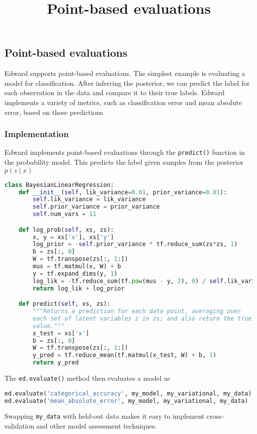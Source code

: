 \title{Point-based evaluations}

\subsection{Point-based evaluations}

Edward supports point-based evaluations. The simplest example is
evaluating a model for classification. After inferring the posterior,
we can predict the label for each observation in the data and compare
it to their true labels. Edward implements a variety of metrics, such
as classification error and mean absolute error, based on these
predictions.

\subsubsection{Implementation}

Edward implements point-based evaluations through the
\texttt{predict()} function in the probability model. This
predicts the label given samples from the posterior $p(z \mid x)$
\begin{lstlisting}[language=Python]
class BayesianLinearRegression:
    def __init__(self, lik_variance=0.01, prior_variance=0.01):
        self.lik_variance = lik_variance
        self.prior_variance = prior_variance
        self.num_vars = 11

    def log_prob(self, xs, zs):
        x, y = xs['x'], xs['y']
        log_prior = -self.prior_variance * tf.reduce_sum(zs*zs, 1)
        b = zs[:, 0]
        W = tf.transpose(zs[:, 1:])
        mus = tf.matmul(x, W) + b
        y = tf.expand_dims(y, 1)
        log_lik = -tf.reduce_sum(tf.pow(mus - y, 2), 0) / self.lik_variance
        return log_lik + log_prior

    def predict(self, xs, zs):
        """Returns a prediction for each data point, averaging over
        each set of latent variables z in zs; and also return the true
        value."""
        x_test = xs['x']
        b = zs[:, 0]
        W = tf.transpose(zs[:, 1:])
        y_pred = tf.reduce_mean(tf.matmul(x_test, W) + b, 1)
        return y_pred
\end{lstlisting}

The \texttt{ed.evaluate()} method then evaluates a model as
\begin{lstlisting}[language=Python]
ed.evaluate('categorical_accuracy', my_model, my_variational, my_data)
ed.evaluate('mean_absolute_error', my_model, my_variational, my_data)
\end{lstlisting}
Swapping \texttt{my_data} with held-out data makes it easy to implement
cross-validation and other model assessment techniques.

